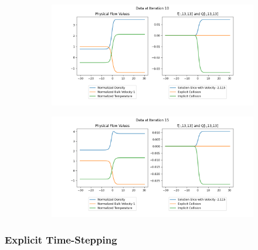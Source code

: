 \documentclass{article}
\begin{document}
\begin{figure}[H]
  
  \begin{subfigure}[b]{\textwidth}
  \includegraphics[width=\textwidth]{imgs/time_step/output_implicit/10.png}
      \label{fig:image3}
  \end{subfigure}
  \hfill
  \begin{subfigure}[b]{\textwidth}
  \includegraphics[width=\textwidth]{imgs/time_step/output_implicit/15.png}
      \label{fig:image4}
  \end{subfigure}
\end{figure}

\subsubsection{Explicit Time-Stepping}
\end{document}
